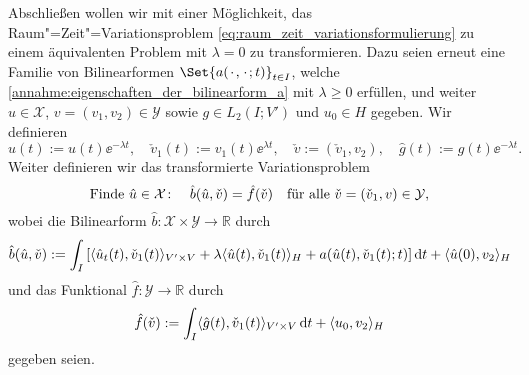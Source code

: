 \documentclass[../main.tex]{subfiles}
\begin{document}
Abschließen wollen wir mit einer Möglichkeit, das Raum"=Zeit"=Variationsproblem \cref{eq:raum_zeit_variationsformulierung} zu einem äquivalenten Problem mit $\lambda = 0$ zu transformieren.
Dazu seien erneut eine Familie von Bilinearformen $\Set{a(\blank, \blank; t)}_{t \in I}$, welche \cref{annahme:eigenschaften_der_bilinearform_a} mit $\lambda \geq 0$ erfüllen, und weiter $u \in \mathcal X$, $v = (v_{1}, v_{2}) \in \mathcal Y$ sowie $g \in L_{2}(I; V')$ und $u_{0} \in H$ gegeben.
Wir definieren
\begin{equation}
    \hat{u}(t) := u(t)\ee^{- \lambda t}, \quad \check{v}_{1}(t) := v_{1}(t)\ee^{\lambda t}, \quad \check{v} := (\check{v}_{1}, v_{2}), \quad \hat{g}(t) := g(t)\ee^{-\lambda t}.
\end{equation}
Weiter definieren wir das transformierte Variationsproblem
\begin{equation}
\label{eq:transformiertes_raum_zeit_variationsproblem}
    \text{Finde } \hat{u} \in \mathcal X \colon \quad \hat{b}(\hat{u}, \check{v}) = \hat{f}(\check{v}) \quad \fa \check{v} = (\check{v}_{1}, v) \in \mathcal Y,
\end{equation}
wobei die Bilinearform $\hat{b} \colon \mathcal X \times \mathcal Y \to \mathbb{R}$ durch
\begin{equation}
    \hat{b}(\hat{u}, \check{v}) := \int_{I} \left[ \langle\hat{u}_{t}(t),\check{v}_{1}(t)\rangle_{V' \times V} + \lambda \langle\hat{u}(t),\check{v}_{1}(t)\rangle_{H} + a(\hat{u}(t), \check{v}_{1}(t); t) \right] \mathop{}\!\mathrm{d} t + \langle\hat{u}(0),v_{2}\rangle_{H}
\end{equation}
und das Funktional $\hat{f} \colon \mathcal Y \to \mathbb{R}$ durch
\begin{equation}
    \hat{f}(\check{v}) := \int_{I} \langle\hat{g}(t),\check{v}_{1}(t)\rangle_{V' \times V} \mathop{}\!\mathrm{d} t + \langle u_{0},v_{2}\rangle_{H}
\end{equation}
gegeben seien.
\end{document}
